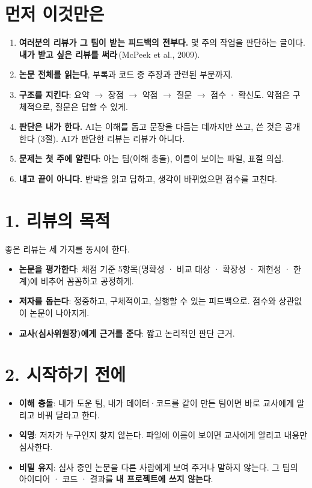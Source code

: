 \documentclass[11pt]{article}
\begin{document}


\section*{먼저 이것만은}
\begin{enumerate}
\item \textbf{여러분의 리뷰가 그 팀이 받는 피드백의 전부다.} 몇 주의 작업을 판단하는 글이다. \textbf{내가 받고 싶은 리뷰를 써라}\,(McPeek et al., 2009).
\item \textbf{논문 전체를 읽는다}, 부록과 코드 중 주장과 관련된 부분까지.
\item \textbf{구조를 지킨다}: 요약 $\to$ 장점 $\to$ 약점 $\to$ 질문 $\to$ 점수 · 확신도. 약점은 구체적으로, 질문은 답할 수 있게.
\item \textbf{판단은 내가 한다.} AI는 이해를 돕고 문장을 다듬는 데까지만 쓰고, 쓴 것은 공개한다 (3절). AI가 판단한 리뷰는 리뷰가 아니다.
\item \textbf{문제는 첫 주에 알린다}: 아는 팀(이해 충돌), 이름이 보이는 파일, 표절 의심.
\item \textbf{내고 끝이 아니다.} 반박을 읽고 답하고, 생각이 바뀌었으면 점수를 고친다.
\end{enumerate}

\section*{1. 리뷰의 목적}
좋은 리뷰는 세 가지를 동시에 한다.
\begin{itemize}
\item \textbf{논문을 평가한다}: 채점 기준 5항목(명확성 · 비교 대상 · 확장성 · 재현성 · 한계)에 비추어 꼼꼼하고 공정하게.
\item \textbf{저자를 돕는다}: 정중하고, 구체적이고, 실행할 수 있는 피드백으로. 점수와 상관없이 논문이 나아지게.
\item \textbf{교사(심사위원장)에게 근거를 준다}: 짧고 논리적인 판단 근거.
\end{itemize}

\section*{2. 시작하기 전에}
\begin{itemize}
\item \textbf{이해 충돌}: 내가 도운 팀, 내가 데이터·코드를 같이 만든 팀이면 바로 교사에게 알리고 바꿔 달라고 한다.
\item \textbf{익명}: 저자가 누구인지 찾지 않는다. 파일에 이름이 보이면 교사에게 알리고 내용만 심사한다.
\item \textbf{비밀 유지}: 심사 중인 논문을 다른 사람에게 보여 주거나 말하지 않는다. 그 팀의 아이디어 · 코드 · 결과를 \textbf{내 프로젝트에 쓰지 않는다}.
\end{itemize}
\end{document}
